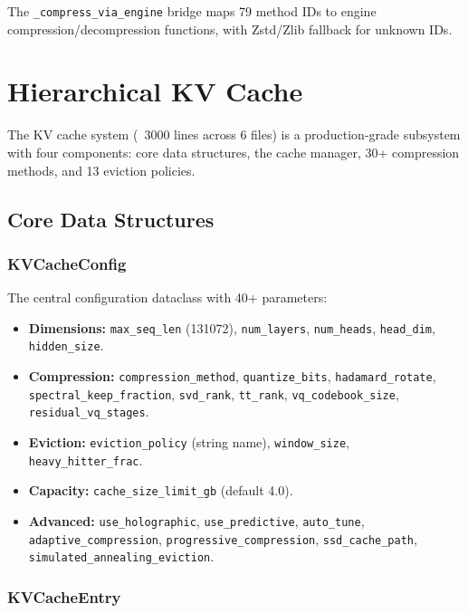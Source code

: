 \documentclass[11pt,a4paper,openright]{book}
\begin{document}
The \texttt{\_compress\_via\_engine} bridge maps 79 method IDs to engine compression/decompression functions, with Zstd/Zlib fallback for unknown IDs.

\chapter{Hierarchical KV Cache}
\label{ch:kvcache}

The KV cache system (~3000 lines across 6 files) is a production-grade subsystem with four components: core data structures, the cache manager, 30+ compression methods, and 13 eviction policies.

\section{Core Data Structures}

\subsection{KVCacheConfig}

The central configuration dataclass with 40+ parameters:

\begin{itemize}
	\item \textbf{Dimensions:} \texttt{max\_seq\_len} (131072), \texttt{num\_layers}, \texttt{num\_heads}, \texttt{head\_dim}, \texttt{hidden\_size}.
	\item \textbf{Compression:} \texttt{compression\_method}, \texttt{quantize\_bits}, \texttt{hadamard\_rotate}, \texttt{spectral\_keep\_fraction}, \texttt{svd\_rank}, \texttt{tt\_rank}, \texttt{vq\_codebook\_size}, \texttt{residual\_vq\_stages}.
	\item \textbf{Eviction:} \texttt{eviction\_policy} (string name), \texttt{window\_size}, \texttt{heavy\_hitter\_frac}.
	\item \textbf{Capacity:} \texttt{cache\_size\_limit\_gb} (default 4.0).
	\item \textbf{Advanced:} \texttt{use\_holographic}, \texttt{use\_predictive}, \texttt{auto\_tune}, \texttt{adaptive\_compression}, \texttt{progressive\_compression}, \texttt{ssd\_cache\_path}, \texttt{simulated\_annealing\_eviction}.
\end{itemize}

\subsection{KVCacheEntry}
\end{document}
